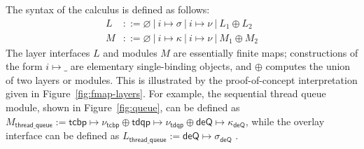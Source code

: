The syntax of the calculus is defined as follows:
\[\begin{array}{rl}
    L &::= \varnothing
            \ |\ i \mapsto \sigma
            \ |\ i \mapsto \nu
            \ |\ L_1 \oplus L_2 \\
    M &::= \varnothing
            \ |\ i \mapsto \kappa
            \ |\ i \mapsto \nu
            \ |\ M_1 \oplus M_2
\end{array}\]
\noindent{}The layer interfaces $L$ and modules $M$
are essentially finite maps;
constructions of the form $i \mapsto \_$
are elementary single-binding objects,
and $\oplus$ computes
the union of two layers or modules.
This is illustrated by the proof-of-concept
interpretation given in 
Figure~\ref{fig:fmap-layers}.
For example, the sequential thread queue module, shown in Figure~\ref{fig:queue},
can be defined as 
$M_\textsf{thread\_queue}:=\textsf{tcbp}\mapsto \nu_\textsf{tcbp} 
\oplus \textsf{tdqp}\mapsto \nu_\textsf{tdqp}
\oplus \textsf{deQ}\mapsto \kappa_\textsf{deQ}$,
while the overlay interface can be defined as 
$L_\textsf{thread\_queue}:= \textsf{deQ}\mapsto \sigma_\textsf{deQ}$ .

